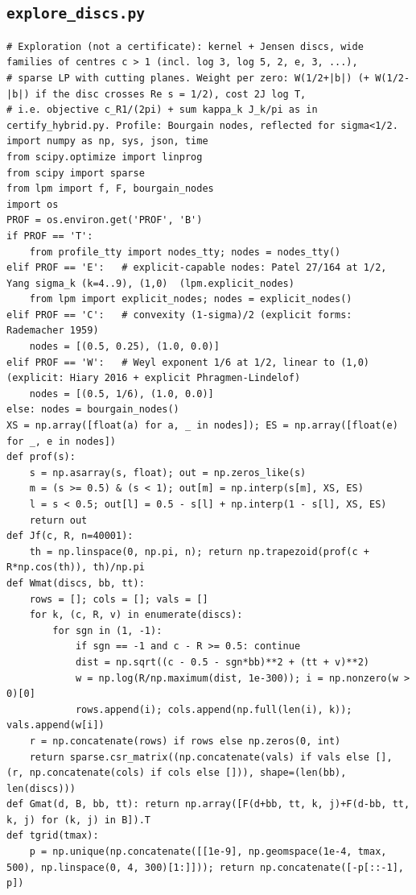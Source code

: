 \documentclass[11pt,reqno]{amsart}
\numberwithin{equation}{section}
\theoremstyle{definition}
\theoremstyle{remark}
\begin{document}
\subsection*{\texttt{explore\_discs.py}}
\begin{lstlisting}
# Exploration (not a certificate): kernel + Jensen discs, wide families of centres c > 1 (incl. log 3, log 5, 2, e, 3, ...),
# sparse LP with cutting planes. Weight per zero: W(1/2+|b|) (+ W(1/2-|b|) if the disc crosses Re s = 1/2), cost 2J log T,
# i.e. objective c_R1/(2pi) + sum kappa_k J_k/pi as in certify_hybrid.py. Profile: Bourgain nodes, reflected for sigma<1/2.
import numpy as np, sys, json, time
from scipy.optimize import linprog
from scipy import sparse
from lpm import f, F, bourgain_nodes
import os
PROF = os.environ.get('PROF', 'B')
if PROF == 'T':
    from profile_tty import nodes_tty; nodes = nodes_tty()
elif PROF == 'E':   # explicit-capable nodes: Patel 27/164 at 1/2, Yang sigma_k (k=4..9), (1,0)  (lpm.explicit_nodes)
    from lpm import explicit_nodes; nodes = explicit_nodes()
elif PROF == 'C':   # convexity (1-sigma)/2 (explicit forms: Rademacher 1959)
    nodes = [(0.5, 0.25), (1.0, 0.0)]
elif PROF == 'W':   # Weyl exponent 1/6 at 1/2, linear to (1,0) (explicit: Hiary 2016 + explicit Phragmen-Lindelof)
    nodes = [(0.5, 1/6), (1.0, 0.0)]
else: nodes = bourgain_nodes()
XS = np.array([float(a) for a, _ in nodes]); ES = np.array([float(e) for _, e in nodes])
def prof(s):
    s = np.asarray(s, float); out = np.zeros_like(s)
    m = (s >= 0.5) & (s < 1); out[m] = np.interp(s[m], XS, ES)
    l = s < 0.5; out[l] = 0.5 - s[l] + np.interp(1 - s[l], XS, ES)
    return out
def Jf(c, R, n=40001):
    th = np.linspace(0, np.pi, n); return np.trapezoid(prof(c + R*np.cos(th)), th)/np.pi
def Wmat(discs, bb, tt):
    rows = []; cols = []; vals = []
    for k, (c, R, v) in enumerate(discs):
        for sgn in (1, -1):
            if sgn == -1 and c - R >= 0.5: continue
            dist = np.sqrt((c - 0.5 - sgn*bb)**2 + (tt + v)**2)
            w = np.log(R/np.maximum(dist, 1e-300)); i = np.nonzero(w > 0)[0]
            rows.append(i); cols.append(np.full(len(i), k)); vals.append(w[i])
    r = np.concatenate(rows) if rows else np.zeros(0, int)
    return sparse.csr_matrix((np.concatenate(vals) if vals else [], (r, np.concatenate(cols) if cols else [])), shape=(len(bb), len(discs)))
def Gmat(d, B, bb, tt): return np.array([F(d+bb, tt, k, j)+F(d-bb, tt, k, j) for (k, j) in B]).T
def tgrid(tmax):
    p = np.unique(np.concatenate([[1e-9], np.geomspace(1e-4, tmax, 500), np.linspace(0, 4, 300)[1:]])); return np.concatenate([-p[::-1], p])

\end{lstlisting}
\end{document}
